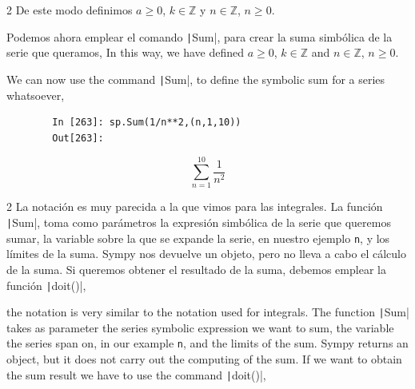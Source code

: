 \begin{paracol}{2}
De este modo definimos $a \ge 0$, $k \in \mathbb{Z}$ y $n \in \mathbb{Z}$, $n\ge 0$.

Podemos ahora emplear el comando \texttt|Sum|, para crear la suma simbólica de la serie que queramos,
\switchcolumn
In this way, we have defined $a \ge 0$, $k \in \mathbb{Z}$ and $n \in \mathbb{Z}$, $n\ge 0$.

We can now use the command \texttt|Sum|, to define the symbolic sum for a series whatsoever,
\end{paracol}
\begin{center}
	\begin{minipage}{.7\textwidth}
		\begin{verbatim}
		In [263]: sp.Sum(1/n**2,(n,1,10))
		Out[263]:	
		\end{verbatim}
		\begin{equation*}
			\sum_{n=1}^{10}\frac{1}{n^2}
		\end{equation*}
	\end{minipage}
\end{center}
\begin{paracol}{2}
La notación es muy parecida a la que vimos para las integrales. La función \texttt|Sum|, toma como parámetros la expresión simbólica de la serie que queremos sumar, la variable sobre la que se expande la serie, en nuestro ejemplo \texttt{n}, y los límites de la suma. Sympy nos devuelve un objeto, pero no lleva a cabo el cálculo de la suma. Si queremos obtener el resultado de la suma, debemos emplear la función \texttt|doit()|,

\switchcolumn
the notation is very similar to the notation used for integrals. The function \texttt|Sum| takes as parameter the series symbolic expression we want to sum, the variable the series span on, in our example \texttt{n}, and the limits of the sum. Sympy returns an object, but it does not carry out the computing of the sum. If we want to obtain the sum result we have to use the command \texttt|doit()|,
\end{paracol}

